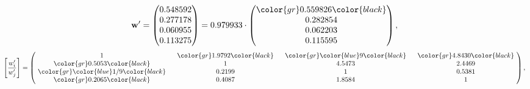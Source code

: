 \begin{example}
\begin{equation*}
\mathbf{w}^{\prime} =
\begin{pmatrix}
0.548592\\
0.277178\\
0.060955\\
0.113275
\end{pmatrix} =
0.979933\cdot
\begin{pmatrix}
\color{gr} 0.559826\color{black} \\
0.282854\\
0.062203\\
0.115595
\end{pmatrix},
\end{equation*}
\begin{equation*}
\left[ \frac{{w}^{\prime}_i}{{w}^{\prime}_j} \right] =
\begin{pmatrix}
$\,\,$ 1 $\,\,$ & $\,\,$\color{gr} 1.9792\color{black} $\,\,$ & $\,\,$\color{gr} \color{blue} 9\color{black} $\,\,$ & $\,\,$\color{gr} 4.8430\color{black} $\,\,$ \\
$\,\,$\color{gr} 0.5053\color{black} $\,\,$ & $\,\,$ 1 $\,\,$ & $\,\,$4.5473$\,\,$ & $\,\,$2.4469  $\,\,$ \\
$\,\,$\color{gr} \color{blue}  1/9\color{black} $\,\,$ & $\,\,$0.2199$\,\,$ & $\,\,$ 1 $\,\,$ & $\,\,$0.5381 $\,\,$ \\
$\,\,$\color{gr} 0.2065\color{black} $\,\,$ & $\,\,$0.4087$\,\,$ & $\,\,$1.8584$\,\,$ & $\,\,$ 1  $\,\,$ \\
\end{pmatrix},
\end{equation*}
\end{example}
\newpage
